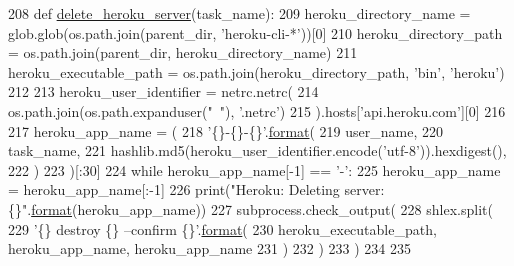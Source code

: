 \begin{DoxyCode}
208 \textcolor{keyword}{def }\hyperlink{namespaceparlai_1_1mturk_1_1core_1_1server__utils_a8dfde882f9d6ff492ca565ae2334fc70}{delete\_heroku\_server}(task\_name):
209     heroku\_directory\_name = glob.glob(os.path.join(parent\_dir, \textcolor{stringliteral}{'heroku-cli-*'}))[0]
210     heroku\_directory\_path = os.path.join(parent\_dir, heroku\_directory\_name)
211     heroku\_executable\_path = os.path.join(heroku\_directory\_path, \textcolor{stringliteral}{'bin'}, \textcolor{stringliteral}{'heroku'})
212 
213     heroku\_user\_identifier = netrc.netrc(
214         os.path.join(os.path.expanduser(\textcolor{stringliteral}{"~"}), \textcolor{stringliteral}{'.netrc'})
215     ).hosts[\textcolor{stringliteral}{'api.heroku.com'}][0]
216 
217     heroku\_app\_name = (
218         \textcolor{stringliteral}{'\{\}-\{\}-\{\}'}.\hyperlink{namespaceparlai_1_1chat__service_1_1services_1_1messenger_1_1shared__utils_a32e2e2022b824fbaf80c747160b52a76}{format}(
219             user\_name,
220             task\_name,
221             hashlib.md5(heroku\_user\_identifier.encode(\textcolor{stringliteral}{'utf-8'})).hexdigest(),
222         )
223     )[:30]
224     \textcolor{keywordflow}{while} heroku\_app\_name[-1] == \textcolor{stringliteral}{'-'}:
225         heroku\_app\_name = heroku\_app\_name[:-1]
226     print(\textcolor{stringliteral}{"Heroku: Deleting server: \{\}"}.\hyperlink{namespaceparlai_1_1chat__service_1_1services_1_1messenger_1_1shared__utils_a32e2e2022b824fbaf80c747160b52a76}{format}(heroku\_app\_name))
227     subprocess.check\_output(
228         shlex.split(
229             \textcolor{stringliteral}{'\{\} destroy \{\} --confirm \{\}'}.\hyperlink{namespaceparlai_1_1chat__service_1_1services_1_1messenger_1_1shared__utils_a32e2e2022b824fbaf80c747160b52a76}{format}(
230                 heroku\_executable\_path, heroku\_app\_name, heroku\_app\_name
231             )
232         )
233     )
234 
235 
\end{DoxyCode}
\mbox{\label{namespaceparlai_1_1chat__service_1_1services_1_1messenger_1_1server__utils_a94445c358161efa9329ecbeefadb01dc}} 
